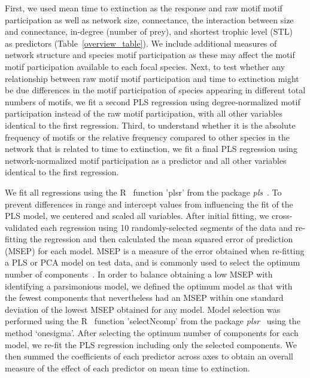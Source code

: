 \documentclass[12pt]{article}
\begin{document}
\begin{spacing}{2.0}
	
	First, we used mean time to extinction as the response and raw motif motif participation as well as network size, connectance, the interaction between size and connectance, in-degree (number of prey), and shortest trophic level (STL)~\citep{Hairston1993} as predictors (Table~\ref{overview_table}).
	We include additional measures of network structure and species motif participation as these may affect the motif motif participation available to each focal species.
	Next, to test whether any relationship between raw motif motif participation and time to extinction might be due differences in the motif participation of species appearing in different total numbers of motifs, we fit a second PLS regression using degree-normalized motif participation instead of the raw motif participation, with all other variables identical to the first regression.
	Third, to understand whether it is the absolute frequency of motifs or the relative frequency compared to other species in the network that is related to time to extinction, we fit a final PLS regression using network-normalized motif participation as a predictor and all other variables identical to the first regression.
	
	
	We fit all regressions using the R~\citep{R} function 'plsr' from the package \emph{pls}~\citep{pls}.
	To prevent differences in range and intercept values from influencing the fit of the PLS model, we centered and scaled all variables.
	After initial fitting, we cross-validated each regression using 10 randomly-selected segments of the data and re-fitting the regression and then calculated the mean squared error of prediction (MSEP) for each model.
	MSEP is a measure of the error obtained when re-fitting a PLS or PCA model on test data, and is commonly used to select the optimum number of components~\citep{Mevik2004}.
	In order to balance obtaining a low MSEP with identifying a parsimonious model, we defined the optimum model as that with the fewest components that nevertheless had an MSEP within one standard deviation of the lowest MSEP obtained for any model.
	Model selection was performed using the R~\citep{R} function 'selectNcomp' from the package \emph{plsr}~\citep{pls} using the method `onesigma'.
	After selecting the optimum number of components for each model, we re-fit the PLS regression including only the selected components. 
	We then summed the coefficients of each predictor across axes to obtain an overall measure of the effect of each predictor on mean time to extinction.

\clearpage



\end{spacing}
\end{document}
